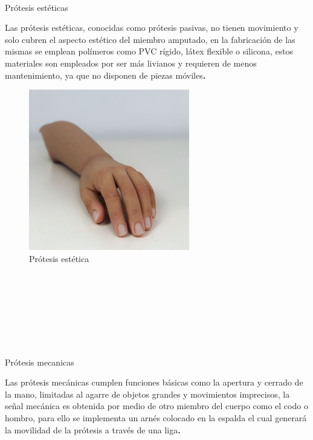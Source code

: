 \documentclass{article}
\begin{document}
 \\
\begin{description}


{Prótesis estéticas} \\

\begin{description}
\item Las prótesis estéticas, conocidas como prótesis pasivas, no tienen movimiento y solo cubren el aspecto estético del miembro amputado, en la fabricación de las mismas se emplean polímeros como PVC rígido, látex flexible o silicona, estos materiales son empleados por ser más livianos y requieren de menos mantenimiento, ya que no disponen de piezas móviles\cite{ff2}\textbf.\\

\begin{figure} [htp]%
    \centering
    \includegraphics[width=70mm]{imagen2.jpg} %
    \caption{Prótesis estética}
    \label{grafica}
\end{figure}
\\
\\
\\
\\
\\
\\
\\

{Prótesis mecanicas} \\
\item Las prótesis mecánicas cumplen funciones básicas como la apertura y cerrado de la mano, limitadas al agarre de objetos grandes y movimientos imprecisos, la señal mecánica es obtenida por medio de otro miembro del cuerpo como el codo o hombro, para ello se implementa un arnés colocado en la espalda el cual generará la movilidad de la prótesis a través de una liga\cite{ff2}\textbf.\\


\end{description}
\end{description}
\end{document}

